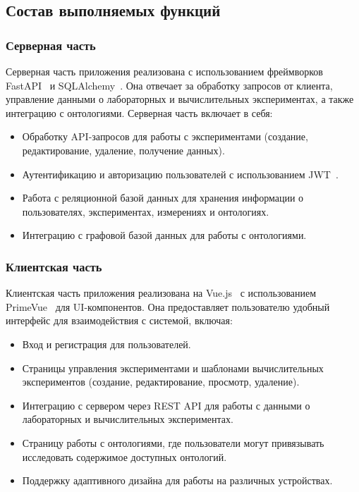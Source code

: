 \documentclass[a4paper,12pt,reqno]{article}
\begin{document}
\subsection{Состав выполняемых функций}

\subsubsection{Серверная часть}
Серверная часть приложения реализована с использованием фреймворков FastAPI~\cite{Framework:FastAPI} и SQLAlchemy~\cite{Library:SQLAlchemy}. Она отвечает за обработку запросов от клиента, управление данными о лабораторных и вычислительных экспериментах, а также интеграцию с онтологиями. Серверная часть включает в себя:
\begin{itemize}
    \item Обработку API-запросов для работы с экспериментами (создание, редактирование, удаление, получение данных).
    \item Аутентификацию и авторизацию пользователей с использованием JWT~\cite{Security:JWT}.
    \item Работа с реляционной базой данных для хранения информации о пользователях, экспериментах, измерениях и онтологиях.
    \item Интеграцию с графовой базой данных для работы с онтологиями.
\end{itemize}

\subsubsection{Клиентская часть}
Клиентская часть приложения реализована на Vue.js~\cite{Framework:VueJS} с использованием PrimeVue~\cite{Framework:PrimeVue} для UI-компонентов. Она предоставляет пользователю удобный интерфейс для взаимодействия с системой, включая:
\begin{itemize}
    \item Вход и регистрация для пользователей.
    \item Страницы управления экспериментами и шаблонами вычислительных экспериментов (создание, редактирование, просмотр, удаление).
    \item Интеграцию с сервером через REST API для работы с данными о лабораторных и вычислительных экспериментах.
    \item Страницу работы с онтологиями, где пользователи могут привязывать исследовать содержимое доступных онтологий.
    \item Поддержку адаптивного дизайна для работы на различных устройствах.
\end{itemize}
\end{document}
